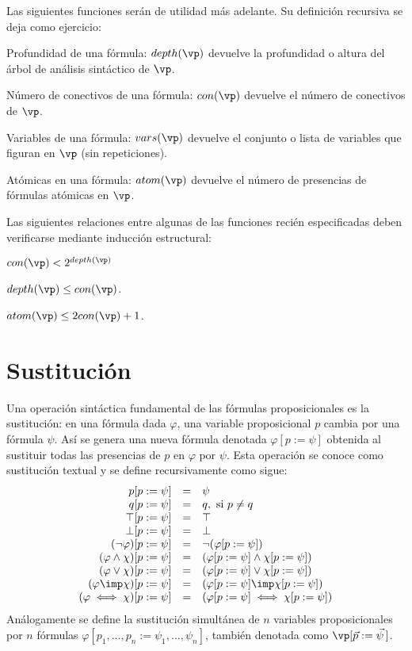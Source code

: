 \documentclass[11pt,letterpaper]{article}
\begin{document}
Las siguientes funciones serán de utilidad más adelante. 
Su definición recursiva se deja como ejercicio:
\bi
 \item Profundidad de una fórmula: 
  $depth(\vp)$ devuelve la profundidad o altura del árbol de análisis 
  sintáctico de $\vp$.
 \item Número de conectivos de una fórmula: 
  $con(\vp)$ devuelve el número de conectivos de $\vp$.
 \item Variables de una fórmula: 
  $vars(\vp)$ devuelve el conjunto o lista de variables que figuran en $\vp$ 
  (sin repeticiones).
 \item Atómicas en una fórmula: 
  $atom(\vp)$ devuelve el número de presencias de fórmulas atómicas en $\vp$.
\ei

Las siguientes relaciones entre algunas de las funciones recién especificadas 
deben verificarse mediante inducción estructural:
\bi
\item $con(\vp) < 2^{depth(\vp)}$
\item $depth(\vp) \leq con(\vp)$.
\item $atom(\vp) \leq 2 con(\vp)+1$.
\ei

\section{Sustitución}
Una operación sintáctica fundamental de las f\'ormulas proposicionales es
la sustitución: en una fórmula dada $\varphi$, una variable proposicional 
$p$ cambia por una fórmula $\psi$.
Así se genera una nueva fórmula denotada $\varphi[p:=\psi]$ obtenida
al sustituir todas las presencias de $p$ en $\varphi$  por $\psi$. 
Esta operación se conoce como sustitución textual y se define recursivamente 
como sigue:
\[
\begin{array}{rll}
p[p:=\psi] & = & \psi \\
q[p:=\psi] & = & q, \text{ si } p\neq q \\
\top[p:=\psi] & = & \top \\
\bot[p:=\psi] & = & \bot \\
(\neg \varphi)[p:=\psi] & = & \neg (\varphi[p:=\psi])\\
(\varphi\land\chi)[p:=\psi] & = &
(\varphi[p:=\psi]\land\chi[p:=\psi])\\
(\varphi\lor\chi)[p:=\psi] & = &
(\varphi[p:=\psi]\lor\chi[p:=\psi])\\
(\varphi\imp\chi)[p:=\psi] & = &
(\varphi[p:=\psi]\imp\chi[p:=\psi])\\
(\varphi\iff\chi)[p:=\psi] & = &
(\varphi[p:=\psi]\iff\chi[p:=\psi])\\
\end{array}
\]
An\'alogamente se define la sustitución simultánea de $n$ variables
proposicionales por $n$ fórmulas 
$\varphi[p_1,\ldots,p_n:=\psi_1,\ldots,\psi_n]$, también
denotada como $\vp[\vec{p}:= \vec{\psi}\,]$.
\end{document}
